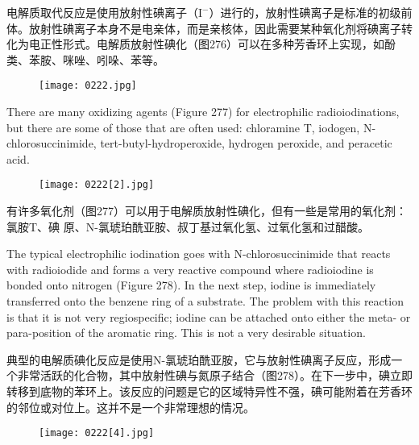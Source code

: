 \documentclass[dvipsnames, svgnames,a4paper,11pt]{article}
\begin{document}
电解质取代反应是使用放射性碘离子（\(\mathrm{I^{-}}\)）进行的，放射性碘离子是标准的初级前体。放射性碘离子本身不是电亲体，而是亲核体，因此需要某种氧化剂将碘离子转化为电正性形式。电解质放射性碘化（图276）可以在多种芳香环上实现，如酚类、苯胺、咪唑、吲哚、苯等。


\begin{figure}[h]
	\centering
    \texttt{[image: 0222.jpg]}  
     \label{fig276}
\end{figure}

There are many oxidizing agents (Figure 277) for electrophilic radioiodinations, but there are some of those that are often used: chloramine T, iodogen, N-chlorosuccinimide, tert-butyl-hydroperoxide, hydrogen peroxide, and peracetic acid.

\begin{figure}[h]
	\centering
    \texttt{[image: 0222[2].jpg]}  
     \label{fig277}
\end{figure}

有许多氧化剂（图277）可以用于电解质放射性碘化，但有一些是常用的氧化剂：氯胺T、碘
原、N-氯琥珀酰亚胺、叔丁基过氧化氢、过氧化氢和过醋酸。


The typical electrophilic iodination goes with N-chlorosuccinimide that reacts with radioiodide and forms a very reactive compound where radioiodine is bonded onto nitrogen (Figure 278). In the next step, iodine is immediately transferred onto the benzene ring of a substrate. The problem with this reaction is that it is not very regiospecific; iodine can be attached onto either the meta- or para-position of the aromatic ring. This is not a very desirable situation.

典型的电解质碘化反应是使用N-氯琥珀酰亚胺，它与放射性碘离子反应，形成一个非常活跃的化合物，其中放射性碘与氮原子结合（图278）。在下一步中，碘立即转移到底物的苯环上。该反应的问题是它的区域特异性不强，碘可能附着在芳香环的邻位或对位上。这并不是一个非常理想的情况。


\begin{figure}[h]
	\centering
    \texttt{[image: 0222[4].jpg]}  
     \label{fig278}
\end{figure}
\end{document}

